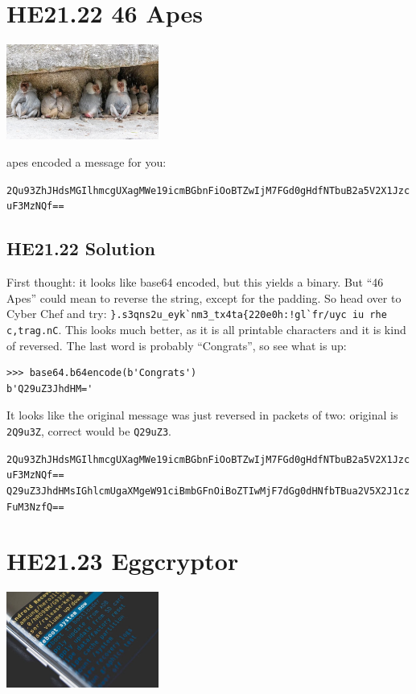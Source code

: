 \documentclass[english,a4paper,nols,noindent]{tufte-handout}
\begin{document}
\hypertarget{he21.22}{%
  \section{HE21.22 46 Apes}
  \label{he21.22}}
\begin{marginfigure}
    \includegraphics[width=50mm]{images/challenge22.jpg}
\end{marginfigure}

 apes encoded a message for you:

\verb+2Qu93ZhJHdsMGIlhmcgUXagMWe19icmBGbnFiOoBTZwIjM7FGd0gHdfNTbuB2a5V2X1JzcuF3MzNQf==+

\hypertarget{he21.22-solution}{%
\subsection{HE21.22 Solution}\label{he21.22-solution}}

\noindent First thought: it looks like base64 encoded, but this yields a binary.  But ``46 Apes'' could mean to reverse the string, except for the padding.  So head over to Cyber Chef and try: \verb+}.s3qns2u_eyk`nm3_tx4ta{220e0h:!gl`fr/uyc iu rhe c,trag.nC+. This looks much better, as it is all printable characters and it is kind of reversed.  The last word is probably ``Congrats'', so see what is up:

\begin{verbatim}
>>> base64.b64encode(b'Congrats')
b'Q29uZ3JhdHM='
\end{verbatim}

It looks like the original message was just reversed in packets of two: original is \verb+2Q9u3Z+, correct would be \verb+Q29uZ3+.

\verb+2Qu93ZhJHdsMGIlhmcgUXagMWe19icmBGbnFiOoBTZwIjM7FGd0gHdfNTbuB2a5V2X1JzcuF3MzNQf==+
\verb+Q29uZ3JhdHMsIGhlcmUgaXMgeW91ciBmbGFnOiBoZTIwMjF7dGg0dHNfbTBua2V5X2J1czFuM3NzfQ==+

\hypertarget{he21.23}{%
  \section{HE21.23 Eggcryptor}
  \label{he21.23}}
\begin{marginfigure}
    \includegraphics[width=50mm]{images/challenge23.jpg}
\end{marginfigure}
\end{document}
